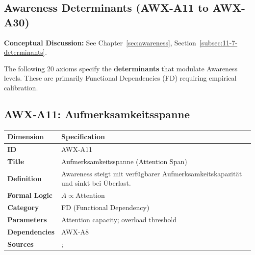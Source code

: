 
\subsection{Awareness Determinants (AWX-A11 to AWX-A30)}

\begin{cross-reference}
\textbf{Conceptual Discussion:} See Chapter~\ref{sec:awareness}, Section~\ref{subsec:11-7-determinants}.
\end{cross-reference}
The following 20 axioms specify the \textbf{determinants} that modulate Awareness levels. These are primarily Functional Dependencies (FD) requiring empirical calibration.


\subsection{AWX-A11: Aufmerksamkeitsspanne}

\begin{table}[htbp]
\small
\begin{tabular}{p{3cm}p{11cm}}
\toprule
\textbf{Dimension} & \textbf{Specification} \\
\midrule
\textbf{ID} & AWX-A11 \\
\textbf{Title} & Aufmerksamkeitsspanne (Attention Span) \\
\textbf{Definition} & Awareness steigt mit verfügbarer Aufmerksamkeitskapazität und sinkt bei Überlast. \\
\textbf{Formal Logic} & $A \propto \text{Attention}$ \\
\textbf{Category} & FD (Functional Dependency) \\
\textbf{Parameters} & Attention capacity; overload threshold \\
\textbf{Dependencies} & AWX-A8 \\
\textbf{Sources} & \citet{PAP-kahneman2003maps}; \citet{sims2003implications} \\
\bottomrule
\end{tabular}
\end{table}

